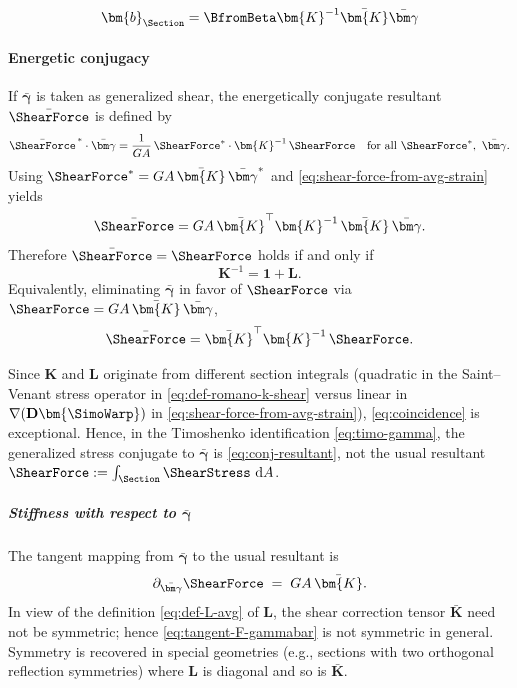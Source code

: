 \begin{equation*}
\bm{b}_{\Section} = \BfromBeta \bm{K}^{-1} \bar{\bm{K}} \bar{\bm\gamma}
\end{equation*}



\paragraph{Energetic conjugacy}

If $\bar{\bm\gamma}$ is taken as generalized shear, the energetically conjugate resultant $\bar{\ShearForce}$ is defined by
\begin{equation}
\bar{\ShearForce}^{\,*}\cdot\bar{\bm\gamma}
=\frac{1}{GA}\,\ShearForce^{*}\cdot\bm{K}^{-1}\,\ShearForce
\quad\text{for all}\ \ShearForce^{*},\ \bar{\bm\gamma}.
\label{eq:def-avg-conj-shear}
\end{equation}
Using $\ShearForce^{*}=GA\,\bar{\bm{K}}\,\bar{\bm\gamma}^{*}$ and \eqref{eq:shear-force-from-avg-strain} yields
\begin{equation}
\label{eq:conj-resultant}
\bar{\ShearForce}=GA\,\bar{\bm{K}}^{\top}\bm{K}^{-1}\,\bar{\bm{K}}\,\bar{\bm\gamma}.
\end{equation}
Therefore $\bar{\ShearForce}=\ShearForce$ holds if and only if
\begin{equation}
\label{eq:coincidence}
\bm{K}^{-1}=\mathbf{1}+\mathbf L.
\end{equation}
%
Equivalently, eliminating $\bar{\bm\gamma}$ in favor of $\ShearForce$ via $\ShearForce=GA\,\bar{\bm{K}}\,\bar{\bm\gamma}$,
\begin{equation}
\label{eq:Fconj-vs-F}
\bar{\ShearForce}=\bar{\bm{K}}^{\top}\bm{K}^{-1}\,\ShearForce.
\end{equation}

Since $\bm{K}$ and $\mathbf L$ originate from different section integrals (quadratic in the Saint–Venant stress operator in \eqref{eq:def-romano-k-shear} versus linear in $\nabla(\mathbf D\bm{\SimoWarp})$ in \eqref{eq:shear-force-from-avg-strain}), \eqref{eq:coincidence} is exceptional. Hence, in the Timoshenko identification \eqref{eq:timo-gamma}, the generalized stress conjugate to $\bar{\bm\gamma}$ is \eqref{eq:conj-resultant}, not the usual resultant $\ShearForce:=\int_{\Section}\ShearStress\mathrm{~d}A$.

\subparagraph{Stiffness with respect to $\bar{\bm\gamma}$}

The tangent mapping from $\bar{\bm\gamma}$ to the usual resultant is
\begin{equation}
\label{eq:tangent-F-gammabar}
\partial_{\bar{\bm\gamma}}\ShearForce \;=\; GA\,\bar{\bm{K}}.
\end{equation}
In view of the definition \eqref{eq:def-L-avg} of \(\mathbf{L}\), the shear correction tensor $\bar{\bm{K}}$ need not be symmetric; hence \eqref{eq:tangent-F-gammabar} is not symmetric in general. 
Symmetry is recovered in special geometries (e.g., sections with two orthogonal reflection symmetries) where $\mathbf L$ is diagonal and so is $\bar{\bm{K}}$.

